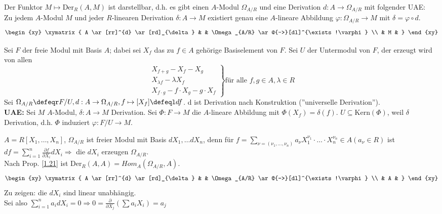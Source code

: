 \begin{PropDef}
\label{1.21}
  Der Funktor $M \mapsto \mbox{Der}_R(A,M)$ ist \glqq darstellbar\grqq, d.h. es
  gibt
  einen $A$-Modul $\Omega_{A/R}$ und eine Derivation $d: A \to \Omega_{A/R}$ mit
  folgender UAE:\\
  Zu jedem $A$-Modul $M$ und jeder $R$-linearen Derivation $\delta: A \to M$
  existiert genau eine $A$-lineare Abbildung $\varphi: \Omega_{A/R} \to M$ mit
  $\delta = \varphi \circ d$.
  \[
    \begin{xy}
      \xymatrix{
         A \ar[rr]^{d} \ar[rd]_{\delta}  &     &  \Omega_{A/R} \ar@{-->}[dl]^{\exists!\varphi}  \\
                                         &  M  &
      }
    \end{xy}
  \]
\end{PropDef}

\begin{Bew}
  Sei $F$ der freie Modul mit Basis $A$; dabei sei $X_f$ das zu $f \in A$
  gehörige Basiselement von $F$.
  Sei $U$ der Untermodul von $F$, der erzeugt wird von allen
  \[\left. \begin{array}{l}
       X_{f+g} - X_f - X_g\\
       X_{\lambda f} - \lambda X_f\\
       X_{f \cdot g} - f \cdot X_g - g \cdot X_f
     \end{array} \right\} \mbox{für alle } f,g \in A, \lambda \in R\]
  Sei $\Omega_{A/R} \defeqr F/U, d: A \to \Omega_{A/R}, f \mapsto [X_f] \defeql
  d f$. d ist Derivation nach Konstruktion (''universelle Derivation'').\\
  \textbf{UAE:} Sei $M$ $A$-Modul, $\delta: A \to M$ Derivation. Sei $\Phi: F \to
  M$ die $A$-lineare Abbildung mit $\Phi(X_f) = \delta(f)$. $U \subseteq
  \mbox{Kern}(\Phi)$, weil $\delta$ Derivation, d.h. $\Phi$ induziert $\varphi:
  F/U \to M$.
\end{Bew}

\begin{nnBsp}
  $A = R[X_1, \dots , X_n]$, $\Omega_{A/R}$ ist freier Modul mit Basis $d X_1,
  \dots d X_n$, denn für $f = \sum_{\nu = (\nu_1, \dots , \nu_n)} a_{\nu}
  X_1^{\nu_1} \cdot \dots \cdot X_n^{\nu_n} \in A (a_{\nu} \in R)$ ist $d f =
  \sum_{i=1}^n \frac{\partial f}{\partial X_i} d X_i \Rightarrow$ die $d X_i$
  erzeugen $\Omega_{A/R}$.\\
  Nach Prop. \ref{1.21} ist $\mbox{Der}_R(A,A) = Hom_A(\Omega_{A/R},A)$.
  \[
    \begin{xy}
      \xymatrix{
         A \ar[rr]^{d} \ar[rd]_{\delta}  &     &  \Omega_{A/R} \ar@{-->}[dl]^{\exists!\varphi}  \\
                                         &  A  &
      }
    \end{xy}
  \]
  Zu zeigen: die $dX_i$ sind linear unabhängig.\\
  Sei also $\sum_{i = 1}^n a_i d X_i = 0 \Rightarrow 0 =
  \frac{\partial}{\partial X_j}(\sum a_i X_i) = a_j$
\end{nnBsp}


